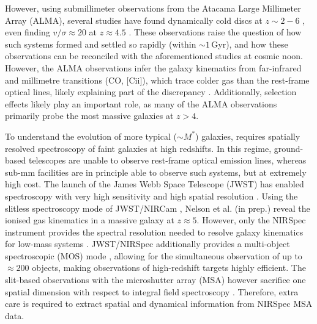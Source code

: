 \documentclass[longauth]{aa}
\newcommand{\kms}{\rm km\,s^{-1}}
\begin{document}
However, using submillimeter observations from the Atacama Large Millimeter Array (ALMA), several studies have found dynamically cold discs at $z\sim2-6$ \citep[e.g.,][]{Neeleman2020,Jones2021,Lelli2021,Rizzo2021,Parlanti2023,Pope2023}, even finding $v/\sigma \approx 20$ at $z\approx 4.5$ \citep{Fraternali2021}. These observations raise the question of how such systems formed and settled so rapidly (within $\sim1$\,Gyr), and how these observations can be reconciled with the aforementioned studies at cosmic noon. However, the ALMA observations infer the galaxy kinematics from far-infrared and millimetre transitions (CO, [C{\sc ii}]), which trace colder gas than the rest-frame optical lines, likely explaining part of the discrepancy \citep{Uebler2019,Rizzo2023}. Additionally, selection effects likely play an important role, as many of the ALMA observations primarily probe the most massive galaxies at $z>4$.



To understand the evolution of more typical ($\sim M^*$) galaxies, requires spatially resolved spectroscopy of faint galaxies at high redshifts. In this regime, ground-based telescopes are unable to observe rest-frame optical emission lines, whereas sub-mm facilities are in principle able to observe such systems, but at extremely high cost. The launch of the James Webb Space Telescope (JWST) has enabled spectroscopy with very high sensitivity and high spatial resolution \citep{Gardner2023,Rigby2023}. Using the slitless spectroscopy mode of JWST/NIRCam \citep{NIRCamInst}, Nelson et al. ({in prep.}) reveal the ionised gas kinematics in a massive galaxy at $z\approx5$. However, only the NIRSpec instrument provides the spectral resolution needed to resolve galaxy kinematics for low-mass systems \citep[$\sigma\approx 50\,\kms$ for a uniformly-illuminated slit;][]{Jakobsen2022}. JWST/NIRSpec additionally provides a multi-object spectroscopic (MOS) mode \citep{Ferruit2022}, allowing for the simultaneous observation of up to $\approx 200$ objects, making observations of high-redshift targets highly efficient. The slit-based observations with the microshutter array (MSA) however sacrifice one spatial dimension with respect to integral field spectroscopy \citep[IFS;][see also \citealt{Price2016}]{Boeker2022}. Therefore, extra care is required to extract spatial and dynamical information from NIRSpec MSA data.
\end{document}
